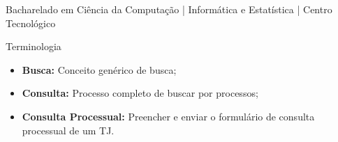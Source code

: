 

{
    \begin{frame}[plain]
        \vspace{18mm}
        \begin{flushright}
        \textcolor{cinza}{\textbf{\large{\thetitle}}}
    \end{flushright}

    \vspace{-6mm}
    \begin{flushright}
        \textcolor{cinza}{\textbf{\scriptsize{\theauthor}}}
    \end{flushright}

    \vspace{-7mm}
    \begin{flushright}
        \textcolor{cinza}{\scriptsize{
            Bacharelado em Ciência da Computação | Informática e Estatística | Centro Tecnológico
        }}
    \end{flushright}


    \end{frame}
}

\begin{frame}{Terminologia}
    \begin{itemize}
        \item \textbf{Busca:} Conceito genérico de busca;
        \item \textbf{Consulta:} Processo completo de buscar por processos;
        \item \textbf{Consulta Processual:} Preencher e enviar o formulário de
            consulta processual de um TJ.
    \end{itemize}
\end{frame}

